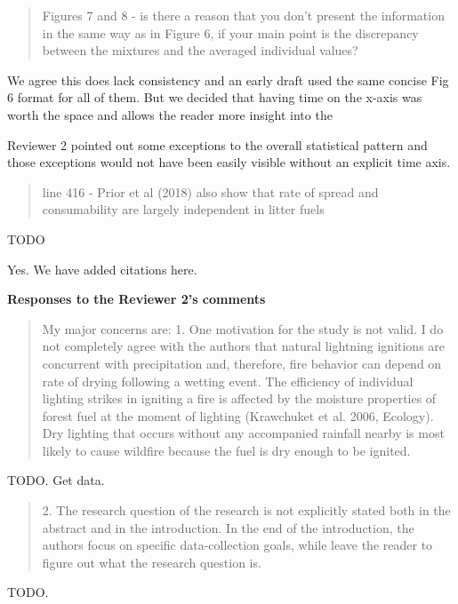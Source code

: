 \documentclass[letterpaper, 12pt]{letter}
\begin{document}
\begin{letter}{}
\begin{quote}
Figures 7 and 8 - is there a reason that you don't present the information in the same way as in Figure 6, if your main point is the discrepancy between the mixtures and the averaged individual values?
\end{quote}

We agree this does lack consistency and an early draft used the same concise Fig 6 format for all of them. But we decided that having time on the x-axis was worth the space and allows the reader more insight into the

Reviewer 2 pointed out some exceptions to the overall statistical pattern and those exceptions would not have been easily visible without an explicit time axis.


\begin{quote}
line 416 - Prior et al (2018) also show that rate of spread and consumability are largely independent in litter fuels
\end{quote}

TODO

Yes. We have added citations here.



{\bf Responses to the Reviewer 2's comments}

\begin{quote}

My major concerns are:
1. One motivation for the study is not valid. I do not completely agree with the authors that natural lightning ignitions are concurrent with precipitation and, therefore, fire behavior can depend on rate of drying following a wetting event. The efficiency of individual lighting strikes in igniting a fire is affected by the moisture properties of forest fuel at the moment of lighting (Krawchuket et al. 2006, Ecology). Dry lighting that occurs without any accompanied rainfall nearby is most likely to cause wildfire because the fuel is dry enough to be ignited.
\end{quote}


TODO.  Get data.


\begin{quote}
2. The research question of the research is not explicitly stated both in the abstract and in the introduction. In the end of the introduction, the authors focus on specific data-collection goals, while leave the reader to figure out what the research question is. 
\end{quote}

TODO.



\end{letter}
\end{document}
